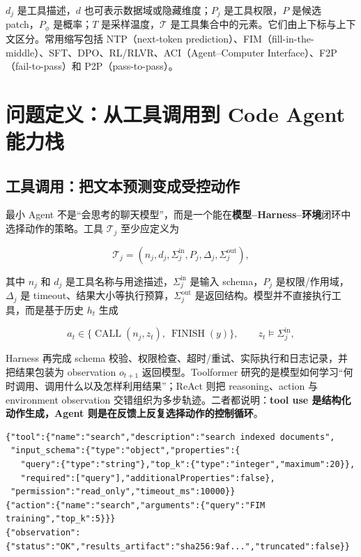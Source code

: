\documentclass[10pt,a4paper,UTF8,fontset=none]{ctexart}
\begin{document}
\begin{keybox}[重载符号与缩写]
\hspace{0.3em}$d_j$ 是工具描述，$d$ 也可表示数据域或隐藏维度；$P_j$ 是工具权限，$P$ 是候选 patch，$P_\phi$ 是概率；$T$ 是采样温度，$\mathcal{T}$ 是工具集合中的元素。它们由上下标与上下文区分。常用缩写包括 NTP（next-token prediction）、FIM（fill-in-the-middle）、SFT、DPO、RL/RLVR、ACI（Agent--Computer Interface）、F2P（fail-to-pass）和 P2P（pass-to-pass）。
\end{keybox}

\clearpage
\section{问题定义：从工具调用到 Code Agent 能力栈}

\subsection{工具调用：把文本预测变成受控动作}

最小 Agent 不是“会思考的聊天模型”，而是一个能在\textbf{模型--Harness--环境}闭环中选择动作的策略。工具 $\mathcal{T}_j$ 至少应定义为

\begin{equation}
\mathcal{T}_j=(n_j,d_j,\Sigma^{\mathrm{in}}_j,P_j,\Delta_j,\Sigma^{\mathrm{out}}_j),
\label{eq:tool-contract}
\end{equation}

其中 $n_j$ 和 $d_j$ 是工具名称与用途描述，$\Sigma^{\mathrm{in}}_j$ 是输入 schema，$P_j$ 是权限/作用域，$\Delta_j$ 是 timeout、结果大小等执行预算，$\Sigma^{\mathrm{out}}_j$ 是返回结构。模型并不直接执行工具，而是基于历史 $h_t$ 生成

\begin{equation}
a_t\in\{\operatorname{CALL}(n_j,z_t),\ \operatorname{FINISH}(y)\},\qquad z_t\models\Sigma^{\mathrm{in}}_j,
\label{eq:tool-action}
\end{equation}

Harness 再完成 schema 校验、权限检查、超时/重试、实际执行和日志记录，并把结果包装为 observation $o_{t+1}$ 返回模型。Toolformer 研究的是模型如何学习“何时调用、调用什么以及怎样利用结果”\cite{schick2023toolformer}；ReAct 则把 reasoning、action 与 environment observation 交错组织为多步轨迹\cite{yao2023react}。二者都说明：\textbf{tool use 是结构化动作生成，Agent 则是在反馈上反复选择动作的控制循环}。

\begin{lstlisting}[style=codeblock,caption={一个最小搜索工具契约及一次调用}]
{"tool":{"name":"search","description":"search indexed documents",
 "input_schema":{"type":"object","properties":{
   "query":{"type":"string"},"top_k":{"type":"integer","maximum":20}},
   "required":["query"],"additionalProperties":false},
 "permission":"read_only","timeout_ms":10000}}
{"action":{"name":"search","arguments":{"query":"FIM training","top_k":5}}}
{"observation":{"status":"OK","results_artifact":"sha256:9af...","truncated":false}}
\end{lstlisting}
\end{document}
